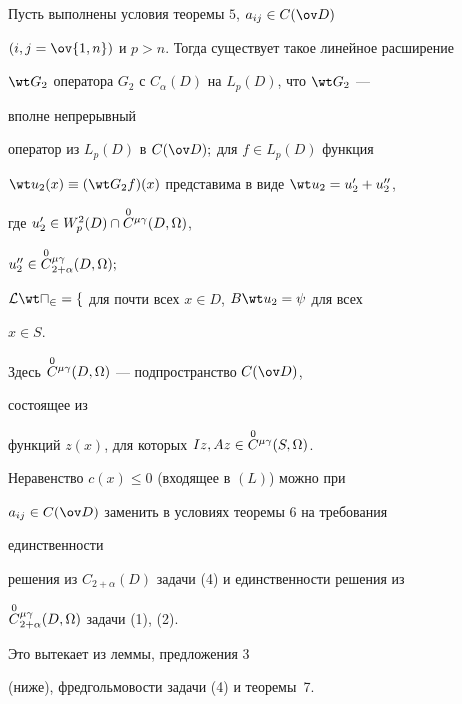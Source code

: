  


\begin{thm} 


Пусть выполнены условия теоремы $5$, $a_{i j}\in C(\ov D)$ 


$(i,j=\ov{1,n})$ и $p>n$. Тогда существует такое линейное расширение 


$\wt G_2$ оператора $G_2$ с $C_\alpha(D)$ на $L_p(D)$, что $\wt G_2$ --- 


вполне непрерывный 


оператор из $L_p(D)$ в $C(\ov D);$ для $f\in L_p(D)$ функция 


$\wt u_2(x)\equiv(\wt G_2f)(x)$ представима в виде $\wt u_2=u'_2+u''_2$, 


где $u'_2\in W^2_p(D)\cap\overset{0}{C}{}^{\mu\gamma}(D,\Omega)$, 


$u''_2\in\overset{0}{C}{}^{\mu\gamma}_{2+\alpha}(D,\Omega);$ 


$\cal L\wt u_2=f$ для почти всех $x\in D$, $B\wt u_2=\psi$ для всех 


$x\in S$. 


\end{thm} 


 


Здесь $\overset{0}{C}{}^{\mu\gamma}(D,\Omega)$ --- подпространство $C(\ov D)$, 


состоящее из 


функций $z(x)$, для которых $I z, A z\in\overset{0}{C}{}^{\mu\gamma}(S,\Omega)$. 


 


\begin{note} 


Неравенство $c(x)\le0$ (входящее в $(L)$) можно при 


$a_{i j}\in C(\ov D)$ заменить в условиях теоремы 6 на требования 


единственности 


решения из $C_{2+\alpha}(D)$ задачи (4) и единственности решения из 


$\overset{0}{C}{}^{\mu\gamma}_{2+\alpha}(D,\Omega)$ задачи (1), (2).





Это вытекает из леммы, предложения 3 


(ниже), фредгольмовости задачи (4) и теоремы~7. 


\end{note}


